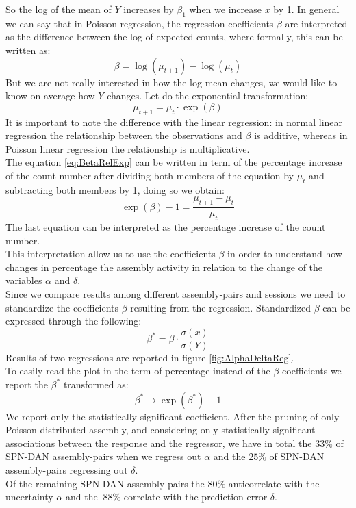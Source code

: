 So the log of the mean of $Y$ increases by $\beta_1$ when we increase $x$ by 1.
In general we can say that in Poisson regression, the regression coefficients $\beta$ are interpreted as the difference between the log of expected counts, where formally, this can be written as:
\begin{equation}
    \beta=\log(\mu_{t+1})-\log(\mu_t)
    \label{eq:BetaRelLog}
\end{equation}
But we are not really interested in how the log mean changes, we would like to know on average how $Y$ changes. 
Let do the exponential transformation:
\begin{equation}
    \mu_{t+1}=\mu_t\cdot \exp(\beta)
    \label{eq:BetaRelExp}
\end{equation}
It is important to note the difference with the linear regression: in normal linear regression the relationship between the observations and $\beta$ is additive, whereas in Poisson linear regression the relationship is multiplicative.\\
The equation \ref{eq:BetaRelExp} can be written in term of the percentage increase of the count number after dividing both members of the equation by $\mu_t$ and subtracting both members by 1, doing so we obtain:
\begin{equation}
\exp(\beta)-1=\frac{\mu_{t+1}-\mu_t}{\mu_t}
    \label{eq:BetaPerc}
\end{equation}
The last equation can be interpreted as the percentage increase of the count number.\\
This interpretation allow us to use the coefficients  $\beta$ in order to understand how changes in percentage the assembly activity in relation to the change of the variables $\alpha$ and $\delta$.\\Since we compare results among different assembly-pairs and sessions we need to standardize the coefficients $\beta$ resulting from the regression. Standardized $\beta$ can be expressed through the following:
\begin{equation}
    \beta^*=\beta\cdot\frac{\sigma(x)}{\sigma(Y)}
    \label{eq:betaStand}
\end{equation}
Results of two regressions are reported in figure \ref{fig:AlphaDeltaReg}.\\
To easily read the plot in the term of percentage instead of the $\beta$ coefficients we report the $\beta^*$ transformed as:
\begin{equation}
    \beta^*\rightarrow \exp(\beta^*)-1
    \label{eq:BetaPlot}
\end{equation}
We report only the statistically significant coefficient. After the pruning of only Poisson distributed assembly, and considering only statistically significant associations between the response and the regressor, we have in total the $33\%$ of SPN-DAN assembly-pairs when we regress out $\alpha$ and the $25\%$ of SPN-DAN assembly-pairs regressing out $\delta$.\\Of the remaining SPN-DAN assembly-pairs the $80\%$ anticorrelate with the uncertainty $\alpha$ and the $~88\%$ correlate with the prediction error $\delta$.




